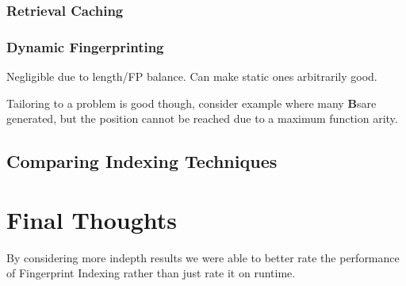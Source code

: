 \subsubsection{Retrieval Caching}
\subsubsection{Dynamic Fingerprinting}
Negligible due to length/FP balance. Can make static ones arbitrarily good.

Tailoring to a problem is good though, consider example where many \textbf{B}sare generated,
 but the position cannot be reached due to a maximum function arity.

\subsection{Comparing Indexing Techniques}

\section{Final Thoughts}

By considering more indepth results we were able to better rate the performance
of Fingerprint Indexing rather than just rate it on runtime.

